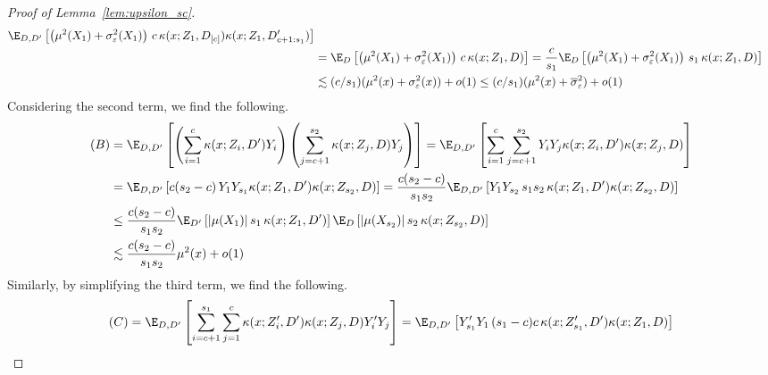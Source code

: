 \begin{proof}[Proof of Lemma~\ref{lem:upsilon_sc}]
\begin{equation}
\begin{aligned}
			\E_{D, D^{\prime}}\left[\left(\mu^2(X_{1}) + \sigma^2_{\varepsilon}(X_{1})\right) \, c \, \kappa(x; Z_1, D_{[c]})\kappa(x; Z_1, D^{\prime}_{c+1:s_1})\right] \\
			 & = \E_{D}\left[\left(\mu^2(X_{1}) + \sigma^2_{\varepsilon}(X_{1})\right) \, c \, \kappa(x; Z_1, D)\right]
			= \frac{c}{s_1} \E_{D}\left[\left(\mu^2(X_{1}) + \sigma^2_{\varepsilon}(X_{1})\right) \, s_1 \, \kappa(x; Z_1, D)\right]                                               \\
			 & \lesssim (c/s_1)(\mu^2(x) + \sigma^2_{\varepsilon}(x)) + o(1)
			\leq (c/s_1)(\mu^2(x) + \overline{\sigma}^2_{\varepsilon}) + o(1)
		\end{aligned}
	\end{equation}
	Considering the second term, we find the following.
	\begin{equation}
		\begin{aligned}
			(B)
			 & = \E_{D, D^{\prime}}\left[\left(\sum_{i = 1}^{c}\kappa(x; Z_{i}, D^{\prime}) Y_{i}\right)\left(\sum_{j = c+1}^{s_2} \kappa(x; Z_j, D) Y_j\right)\right]
			= \E_{D, D^{\prime}}\left[\sum_{i = 1}^{c}\sum_{j = c+1}^{s_2}Y_{i} Y_j \kappa(x; Z_{i}, D^{\prime})\kappa(x; Z_j, D)\right]                               \\
			 & = \E_{D, D^{\prime}}\left[c(s_2 - c) \, Y_1 Y_{s_1} \kappa(x; Z_1, D^{\prime})\kappa(x; Z_{s_2}, D)\right]
			= \frac{c (s_2 - c)}{s_1 s_2}\E_{D, D^{\prime}}\left[Y_1 Y_{s_2} \, s_1 s_2 \,\kappa(x; Z_1, D^{\prime})\kappa(x; Z_{s_2}, D)\right]                   \\
			 & \leq \frac{c (s_2 - c)}{s_1 s_2}
			\E_{D^{\prime}}\left[|\mu(X_1)| \, s_1  \,\kappa(x; Z_1, D^{\prime})\right]
			\E_{D}\left[|\mu(X_{s_2})| \, s_2  \,\kappa(x; Z_{s_2}, D)\right]                                                                                       \\
			 & \lesssim \frac{c(s_2 - c)}{s_1 s_2} \mu^2(x) + o(1)
		\end{aligned}
	\end{equation}
	Similarly, by simplifying the third term, we find the following.
	\begin{equation}
		\begin{aligned}
			(C)
			 & = \E_{D, D^{\prime}}\left[\sum_{i = c+1}^{s_1}\sum_{j = 1}^{c} \kappa(x; Z_{i}^{\prime}, D^{\prime})\kappa(x; Z_j, D)Y_{i}^{\prime} Y_j\right]
			= \E_{D, D^{\prime}}\left[Y_{s_1}^{\prime} Y_{1} \, (s_1 - c)c \, \kappa(x; Z_{s_1}^{\prime}, D^{\prime})\kappa(x; Z_1, D)\right]                                                    \\

\end{aligned}
\end{equation}
\end{proof}
